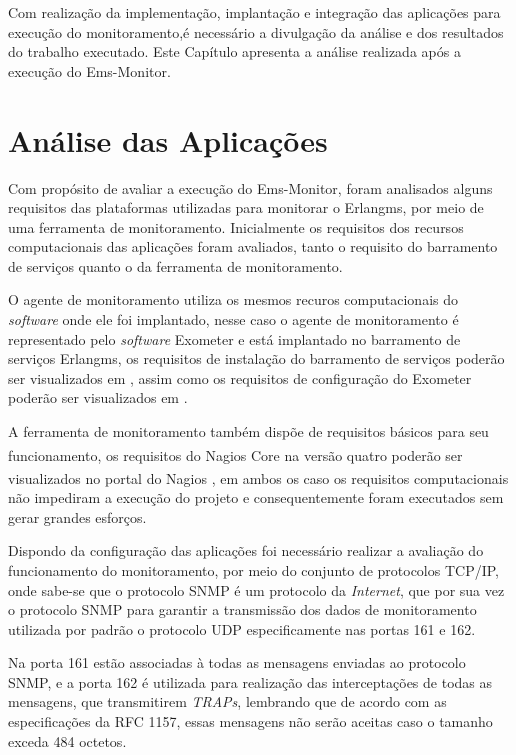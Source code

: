 \label{analise_monitoramento_servicos}

Com realização da implementação, implantação e integração das aplicações para execução do monitoramento,é necessário a divulgação da análise e dos resultados do trabalho executado. Este Capítulo apresenta a análise realizada após a execução do Ems-Monitor.


\section{Análise das Aplicações}
\label{analise}
Com propósito de avaliar a execução do Ems-Monitor, foram analisados alguns requisitos das plataformas utilizadas para monitorar o Erlangms, por meio de uma ferramenta de monitoramento. Inicialmente os requisitos dos recursos computacionais das aplicações foram avaliados, tanto o requisito do barramento de serviços quanto o da ferramenta de monitoramento. 

O agente de monitoramento utiliza os mesmos recuros computacionais do \textit{software} onde ele foi implantado, nesse caso o agente de monitoramento é representado pelo \textit{software} Exometer e está implantado no barramento de serviços Erlangms, os requisitos de instalação do barramento de serviços poderão ser visualizados em \cite{erlangms_gitHub}, assim como os requisitos de configuração do Exometer poderão ser visualizados em \cite{exometer_gitHub}. 

A ferramenta de monitoramento também dispõe de requisitos básicos para seu funcionamento, os requisitos do Nagios Core\textsuperscript{\textregistered} na versão quatro poderão ser visualizados no portal do Nagios\textsuperscript{\textregistered} \cite{nagios_core_configuration}, em ambos os caso os requisitos computacionais não impediram a execução do projeto e consequentemente foram executados sem gerar grandes esforços.

Dispondo da configuração das aplicações foi necessário realizar a avaliação do funcionamento do monitoramento, por meio do conjunto de protocolos TCP/IP, onde sabe-se que o protocolo \acrshort{SNMP} é um protocolo da \textit{Internet}, que por sua vez o protocolo \acrshort{SNMP} para garantir a transmissão dos dados de monitoramento utilizada por padrão o protocolo UDP especificamente nas portas 161 e 162. 

Na porta 161 estão associadas à todas as mensagens enviadas ao protocolo \acrshort{SNMP}, e a porta 162 é utilizada para realização das interceptações de todas as mensagens, que transmitirem \textit{TRAPs}, lembrando que de acordo com as especificações da RFC 1157, essas mensagens não serão aceitas caso o tamanho exceda 484 octetos\cite{Schoffstall}. 

